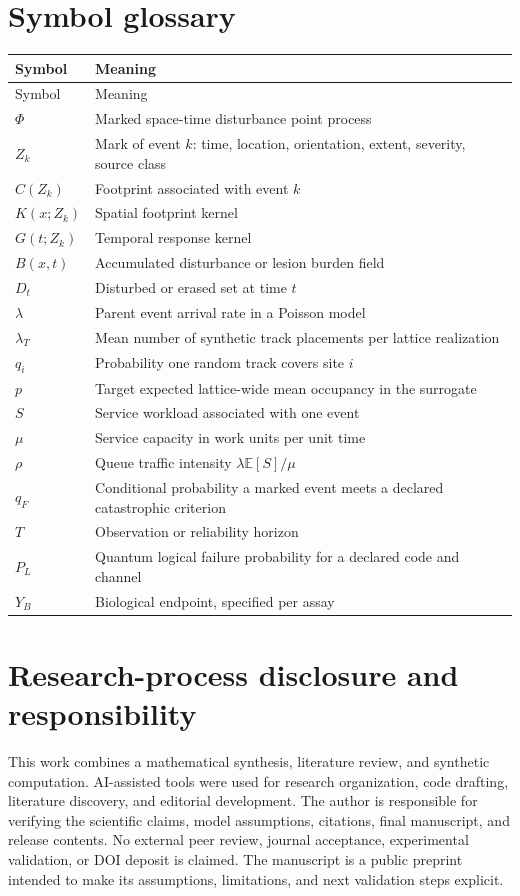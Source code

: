 \documentclass[11pt,a4paper,oneside]{article}
\newcommand{\E}{\mathbb{E}}\newcommand{\Pp}{\mathbb{P}}\newcommand{\R}{\mathbb{R}}\newcommand{\N}{\mathbb{N}}\newcommand{\cX}{\mathcal{X}}\newcommand{\cE}{\mathcal{E}}\newcommand{\cF}{\mathcal{F}}\newcommand{\cS}{\mathcal{S}}\newcommand{\cD}{\mathcal{D}}\newcommand{\cR}{\mathcal{R}}\newcommand{\cC}{\mathcal{C}}\newcommand{\cL}{\mathcal{L}}\newcommand{\cN}{\mathcal{N}}\newcommand{\dd}{\,\mathrm{d}}\newcommand{\Prob}{\mathrm{Pr}}\newcommand{\Var}{\mathrm{Var}}\newcommand{\Cov}{\mathrm{Cov}}\newcommand{\diag}{\mathrm{diag}}\newcommand{\tr}{\mathrm{tr}}\newcommand{\argmin}{\operatorname*{arg\,min}}\newcommand{\argmax}{\operatorname*{arg\,max}}
\begin{document}
\section{Symbol glossary}
\begin{longtable}{p{.17\linewidth}p{.75\linewidth}}\toprule
Symbol & Meaning\\\midrule\endfirsthead
\toprule Symbol & Meaning\\\midrule\endhead
\(\Phi\) & Marked space-time disturbance point process\\
\(Z_k\) & Mark of event \(k\): time, location, orientation, extent, severity, source class\\
\(C(Z_k)\) & Footprint associated with event \(k\)\\
\(K(x;Z_k)\) & Spatial footprint kernel\\
\(G(t;Z_k)\) & Temporal response kernel\\
\(B(x,t)\) & Accumulated disturbance or lesion burden field\\
\(D_t\) & Disturbed or erased set at time \(t\)\\
\(\lambda\) & Parent event arrival rate in a Poisson model\\
\(\lambda_T\) & Mean number of synthetic track placements per lattice realization\\
\(q_i\) & Probability one random track covers site \(i\)\\
\(p\) & Target expected lattice-wide mean occupancy in the surrogate\\
\(S\) & Service workload associated with one event\\
\(\mu\) & Service capacity in work units per unit time\\
\(\rho\) & Queue traffic intensity \(\lambda\E[S]/\mu\)\\
\(q_F\) & Conditional probability a marked event meets a declared catastrophic criterion\\
\(T\) & Observation or reliability horizon\\
\(P_L\) & Quantum logical failure probability for a declared code and channel\\
\(Y_B\) & Biological endpoint, specified per assay\\\bottomrule
\end{longtable}

\section{Research-process disclosure and responsibility}
This work combines a mathematical synthesis, literature review, and synthetic computation. AI-assisted tools were used for research organization, code drafting, literature discovery, and editorial development. The author is responsible for verifying the scientific claims, model assumptions, citations, final manuscript, and release contents. No external peer review, journal acceptance, experimental validation, or DOI deposit is claimed. The manuscript is a public preprint intended to make its assumptions, limitations, and next validation steps explicit.

{\small}
\end{document}

